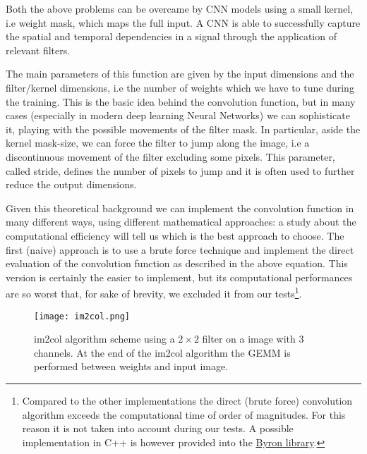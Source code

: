 \documentclass{standalone}
\begin{document}
Both the above problems can be overcame by CNN models using a small kernel, i.e weight mask, which maps the full input.
A CNN is able to successfully capture the spatial and temporal dependencies in a signal through the application of relevant filters.

The main parameters of this function are given by the input dimensions and the filter/kernel dimensions, i.e the number of weights which we have to tune during the training.
This is the basic idea behind the convolution function, but in many cases (especially in modern deep learning Neural Networks) we can sophisticate it, playing with the possible movements of the filter mask.
In particular, aside the kernel mask-size, we can force the filter to jump along the image, i.e a discontinuous movement of the filter excluding some pixels.
This parameter, called \textsf{stride}, defines the number of pixels to jump and it is often used to further reduce the output dimensions.

Given this theoretical background we can implement the convolution function in many different ways, using different mathematical approaches: a study about the computational efficiency will tell us which is the best approach to choose.
The first (naive) approach is to use a brute force technique and implement the direct evaluation of the convolution function as described in the above equation.
This version is certainly the easier to implement, but its computational performances are so worst that, for sake of brevity, we excluded it from our tests\footnote{
  Compared to the other implementations the direct (brute force) convolution algorithm exceeds the computational time of order of magnitudes.
  For this reason it is not taken into account during our tests.
  A possible implementation in \textsf{C++} is however provided into the \href{https://github.com/Nico-Curti/Byron/blob/master/utility/winograd_test.cpp}{\textsf{Byron} library}.
}.

\begin{center}
\begin{figure}[htbp]
\centering
\texttt{[image: im2col.png]}
\caption{\textsf{im2col} algorithm scheme using a $2\times2$ filter on a image with 3 channels.
At the end of the \textsf{im2col} algorithm the \textsf{GEMM} is performed between weights and input image.
}
\label{fig:im2col}
\end{figure}
\end{center}
\end{document}
